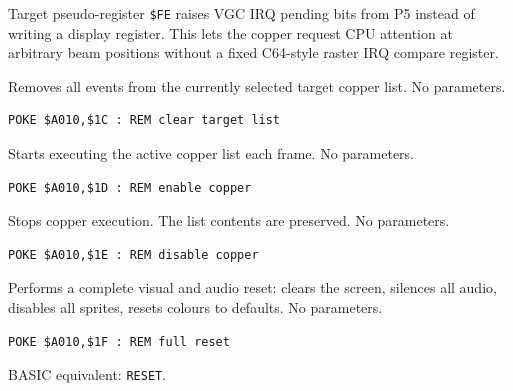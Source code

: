 \begin{tipbox}
Target pseudo-register \texttt{\$FE} raises VGC IRQ pending bits from P5
instead of writing a display register.  This lets the copper request CPU
attention at arbitrary beam positions without a fixed C64-style raster IRQ
compare register.
\end{tipbox}



Removes all events from the currently selected target copper list.  No
parameters.

\begin{lstlisting}
POKE $A010,$1C : REM clear target list
\end{lstlisting}



Starts executing the active copper list each frame.  No parameters.

\begin{lstlisting}
POKE $A010,$1D : REM enable copper
\end{lstlisting}



Stops copper execution.  The list contents are preserved.  No parameters.

\begin{lstlisting}
POKE $A010,$1E : REM disable copper
\end{lstlisting}



Performs a complete visual and audio reset: clears the screen, silences all
audio, disables all sprites, resets colours to defaults.  No parameters.

\begin{lstlisting}
POKE $A010,$1F : REM full reset
\end{lstlisting}

\begin{notebox}
BASIC equivalent: \texttt{RESET}.
\end{notebox}

